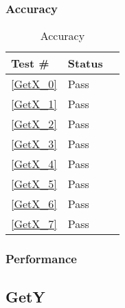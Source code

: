 \documentclass[12pt]{article}
\begin{document}
	\subsubsection{Accuracy}
		\begin{table}[H]
		\centering
		\caption{Accuracy}\label{GetX_acc}
		\begin{tabular}{lll}
		\toprule
		\bf Test \# & Status\\\midrule
		\ref{GetX_0} & Pass\\
		\ref{GetX_1} & Pass\\
		\ref{GetX_2} & Pass\\
		\ref{GetX_3} & Pass\\
		\ref{GetX_4} & Pass\\
		\ref{GetX_5} & Pass\\
		\ref{GetX_6} & Pass\\
		\ref{GetX_7} & Pass\\
		\bottomrule
		\end{tabular}
		\end{table}
	\subsubsection{Performance}


\subsection{GetY} %
\end{document}
